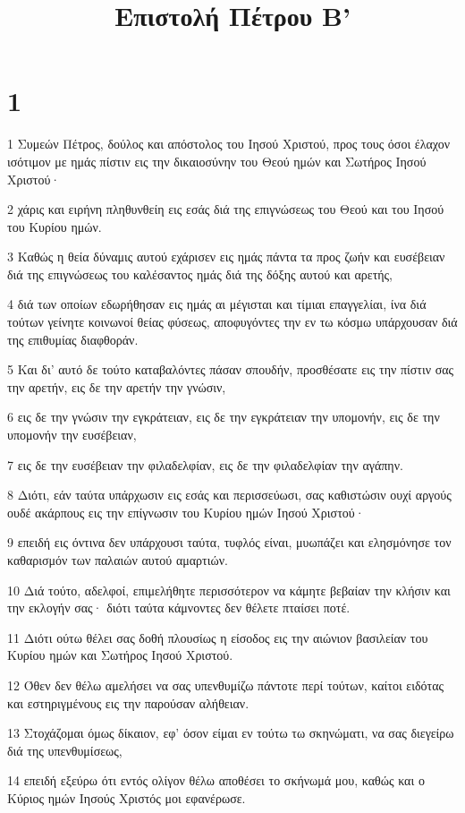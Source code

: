 

\title{Επιστολή Πέτρου Β'}


\chapter{1}

\par 1 Συμεών Πέτρος, δούλος και απόστολος του Ιησού Χριστού, προς τους όσοι έλαχον ισότιμον με ημάς πίστιν εις την δικαιοσύνην του Θεού ημών και Σωτήρος Ιησού Χριστού·
\par 2 χάρις και ειρήνη πληθυνθείη εις εσάς διά της επιγνώσεως του Θεού και του Ιησού του Κυρίου ημών.
\par 3 Καθώς η θεία δύναμις αυτού εχάρισεν εις ημάς πάντα τα προς ζωήν και ευσέβειαν διά της επιγνώσεως του καλέσαντος ημάς διά της δόξης αυτού και αρετής,
\par 4 διά των οποίων εδωρήθησαν εις ημάς αι μέγισται και τίμιαι επαγγελίαι, ίνα διά τούτων γείνητε κοινωνοί θείας φύσεως, αποφυγόντες την εν τω κόσμω υπάρχουσαν διά της επιθυμίας διαφθοράν.
\par 5 Και δι' αυτό δε τούτο καταβαλόντες πάσαν σπουδήν, προσθέσατε εις την πίστιν σας την αρετήν, εις δε την αρετήν την γνώσιν,
\par 6 εις δε την γνώσιν την εγκράτειαν, εις δε την εγκράτειαν την υπομονήν, εις δε την υπομονήν την ευσέβειαν,
\par 7 εις δε την ευσέβειαν την φιλαδελφίαν, εις δε την φιλαδελφίαν την αγάπην.
\par 8 Διότι, εάν ταύτα υπάρχωσιν εις εσάς και περισσεύωσι, σας καθιστώσιν ουχί αργούς ουδέ ακάρπους εις την επίγνωσιν του Κυρίου ημών Ιησού Χριστού·
\par 9 επειδή εις όντινα δεν υπάρχουσι ταύτα, τυφλός είναι, μυωπάζει και ελησμόνησε τον καθαρισμόν των παλαιών αυτού αμαρτιών.
\par 10 Διά τούτο, αδελφοί, επιμελήθητε περισσότερον να κάμητε βεβαίαν την κλήσιν και την εκλογήν σας· διότι ταύτα κάμνοντες δεν θέλετε πταίσει ποτέ.
\par 11 Διότι ούτω θέλει σας δοθή πλουσίως η είσοδος εις την αιώνιον βασιλείαν του Κυρίου ημών και Σωτήρος Ιησού Χριστού.
\par 12 Όθεν δεν θέλω αμελήσει να σας υπενθυμίζω πάντοτε περί τούτων, καίτοι ειδότας και εστηριγμένους εις την παρούσαν αλήθειαν.
\par 13 Στοχάζομαι όμως δίκαιον, εφ' όσον είμαι εν τούτω τω σκηνώματι, να σας διεγείρω διά της υπενθυμίσεως,
\par 14 επειδή εξεύρω ότι εντός ολίγον θέλω αποθέσει το σκήνωμά μου, καθώς και ο Κύριος ημών Ιησούς Χριστός μοι εφανέρωσε.

